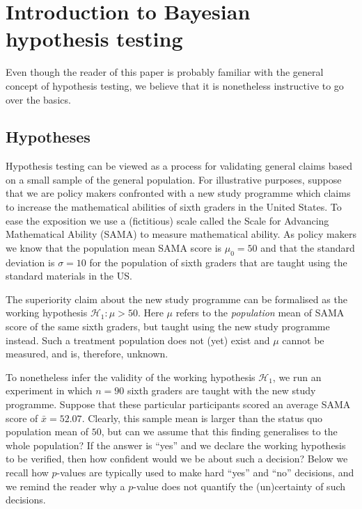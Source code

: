 \documentclass[english,,doc,floatsintext]{apa6}
\begin{document}
\hypertarget{introduction-to-bayesian-hypothesis-testing}{%
\section{Introduction to Bayesian hypothesis testing}\label{introduction-to-bayesian-hypothesis-testing}}

Even though the reader of this paper is probably familiar with the general concept of hypothesis testing, we believe that it is nonetheless instructive to go over the basics.

\hypertarget{hypotheses}{%
\subsection{Hypotheses}\label{hypotheses}}

Hypothesis testing can be viewed as a process for validating general claims based on a small sample of the general population. For illustrative purposes, suppose that we are policy makers confronted with a new study programme which claims to increase the mathematical abilities of sixth graders in the United States. To ease the exposition we use a (fictitious) scale called the Scale for Advancing Mathematical Ability (SAMA) to measure mathematical ability. As policy makers we know that the population mean SAMA score is \(\mu_{0}=50\) and that the standard deviation is \(\sigma=10\) for the population of sixth graders that are taught using the standard materials in the US.

The superiority claim about the new study programme can be formalised as the working hypothesis \(\mathcal{H}_{1} : \mu > 50\). Here \(\mu\) refers to the \emph{population} mean of SAMA score of the same sixth graders, but taught using the new study programme instead. Such a treatment population does not (yet) exist and \(\mu\) cannot be measured, and is, therefore, unknown.

To nonetheless infer the validity of the working hypothesis \(\mathcal{H}_{1}\), we run an experiment in which \(n=90\) sixth graders are taught with the new study programme. Suppose that these particular participants scored an average SAMA score of \(\bar{x} = 52.07\). Clearly, this sample mean is larger than the status quo population mean of \(50\), but can we assume that this finding generalises to the whole population? If the answer is \enquote{yes} and we declare the working hypothesis to be verified, then how confident would we be about such a decision? Below we recall how \(p\)-values are typically used to make hard \enquote{yes} and \enquote{no} decisions, and we remind the reader why a \(p\)-value does not quantify the (un)certainty of such decisions.
\end{document}
